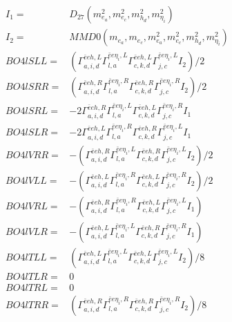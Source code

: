 \documentclass[A4,landscape]{article}
\begin{document}
\begin{align} 
I_1 = & D_{27}(m^2_{e_{{a}}}, m^2_{e_{{c}}}, m^2_{h_{{d}}}, m^2_{\eta_i}) \\ 
I_2 = & MMD0(m_{e_{{a}}}, m_{e_{{c}}}, m^2_{e_{{a}}}, m^2_{e_{{c}}}, m^2_{h_{{d}}}, m^2_{\eta_i}) \\ 
  BO4lSLL= & ( \Gamma^{\bar{e}e h ,L}_{a, i, d} \Gamma^{\bar{e}e \eta_i ,L}_{l, a} \Gamma^{\bar{e}e h ,L}_{c, k, d} \Gamma^{\bar{e}e \eta_i ,L}_{j, c} I_2)/2 \\ 
  BO4lSRR= & ( \Gamma^{\bar{e}e h ,R}_{a, i, d} \Gamma^{\bar{e}e \eta_i ,R}_{l, a} \Gamma^{\bar{e}e h ,R}_{c, k, d} \Gamma^{\bar{e}e \eta_i ,R}_{j, c} I_2)/2 \\ 
  BO4lSRL= & -2  \Gamma^{\bar{e}e h ,R}_{a, i, d} \Gamma^{\bar{e}e \eta_i ,L}_{l, a} \Gamma^{\bar{e}e h ,L}_{c, k, d} \Gamma^{\bar{e}e \eta_i ,R}_{j, c} I_1 \\ 
  BO4lSLR= & -2  \Gamma^{\bar{e}e h ,L}_{a, i, d} \Gamma^{\bar{e}e \eta_i ,R}_{l, a} \Gamma^{\bar{e}e h ,R}_{c, k, d} \Gamma^{\bar{e}e \eta_i ,L}_{j, c} I_1 \\ 
  BO4lVRR= & -( \Gamma^{\bar{e}e h ,R}_{a, i, d} \Gamma^{\bar{e}e \eta_i ,L}_{l, a} \Gamma^{\bar{e}e h ,R}_{c, k, d} \Gamma^{\bar{e}e \eta_i ,L}_{j, c} I_2)/2 \\ 
  BO4lVLL= & -( \Gamma^{\bar{e}e h ,L}_{a, i, d} \Gamma^{\bar{e}e \eta_i ,R}_{l, a} \Gamma^{\bar{e}e h ,L}_{c, k, d} \Gamma^{\bar{e}e \eta_i ,R}_{j, c} I_2)/2 \\ 
  BO4lVRL= & -( \Gamma^{\bar{e}e h ,R}_{a, i, d} \Gamma^{\bar{e}e \eta_i ,R}_{l, a} \Gamma^{\bar{e}e h ,L}_{c, k, d} \Gamma^{\bar{e}e \eta_i ,L}_{j, c} I_1) \\ 
  BO4lVLR= & -( \Gamma^{\bar{e}e h ,L}_{a, i, d} \Gamma^{\bar{e}e \eta_i ,L}_{l, a} \Gamma^{\bar{e}e h ,R}_{c, k, d} \Gamma^{\bar{e}e \eta_i ,R}_{j, c} I_1) \\ 
  BO4lTLL= & ( \Gamma^{\bar{e}e h ,L}_{a, i, d} \Gamma^{\bar{e}e \eta_i ,L}_{l, a} \Gamma^{\bar{e}e h ,L}_{c, k, d} \Gamma^{\bar{e}e \eta_i ,L}_{j, c} I_2)/8 \\ 
  BO4lTLR= & 0 \\ 
  BO4lTRL= & 0 \\ 
  BO4lTRR= & ( \Gamma^{\bar{e}e h ,R}_{a, i, d} \Gamma^{\bar{e}e \eta_i ,R}_{l, a} \Gamma^{\bar{e}e h ,R}_{c, k, d} \Gamma^{\bar{e}e \eta_i ,R}_{j, c} I_2)/8 \\ 
\end{align} 
\end{document}
